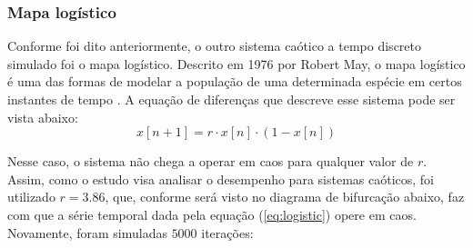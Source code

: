 \documentclass[10pt, technote]{article}
\begin{document}
\subsubsection{Mapa logístico}

Conforme foi dito anteriormente, o outro sistema caótico a tempo discreto simulado foi o mapa logístico. Descrito em 1976 por Robert May, o mapa logístico é uma das formas de modelar a população de uma determinada espécie em certos instantes de tempo \cite{may1976simple}. A equação de diferenças que descreve esse sistema pode ser vista abaixo:
\begin{equation}\label{eq:logistic}
x[n+1] = r\cdot x[n] \cdot (1 - x[n])
\end{equation}

Nesse caso, o sistema não chega a operar em caos para qualquer valor de $r$. Assim, como o estudo visa analisar o desempenho para sistemas caóticos, foi utilizado $r=3.86$, que, conforme será visto no diagrama de bifurcação abaixo, faz com que a série temporal dada pela equação (\ref{eq:logistic}) opere em caos. Novamente, foram simuladas $5000$ iterações:
\end{document}
